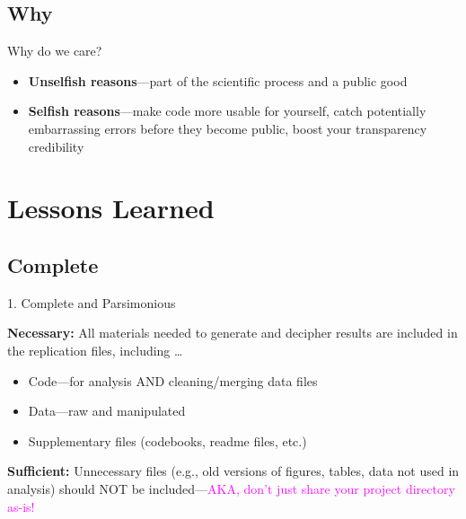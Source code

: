 \documentclass[12pt, compress]{beamer} %
\let\olditem\item %
\renewcommand{\item}{%
\olditem\vspace{\fill}}
\begin{document}
\subsection{Why}		
	\begin{frame}{Why do we care?}
		\begin{itemize}
			\item \textbf{Unselfish reasons}---part of the scientific process and a public good
			\item \textbf{Selfish reasons}---make code more usable for yourself, catch potentially embarrassing errors before they become public, boost your transparency credibility
		\end{itemize}
		
	\end{frame}
	

\section{Lessons Learned}
\subsection{Complete}
	\begin{frame}{1. Complete and Parsimonious}
	
	\textbf{Necessary:} All materials needed to generate and decipher results are included in the replication files, including \dots

		\begin{itemize}		
			\item Code---for analysis AND cleaning/merging data files
			\item Data---raw and manipulated
			\item Supplementary files (codebooks, readme files, etc.)
		\end{itemize} 
		
		\bigskip
		
	\textbf{Sufficient:} Unnecessary files (e.g., old versions of figures, tables, data not used in analysis) should NOT be included---\textcolor{magenta}{AKA, don't just share your project directory as-is!}
			
	\end{frame}


\end{document}
